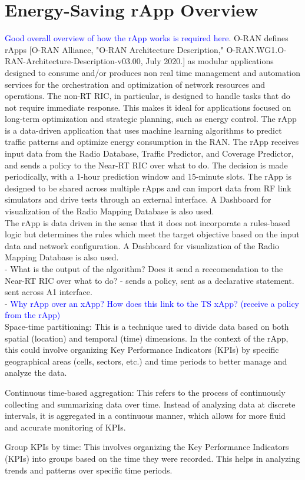 \section{Energy-Saving rApp Overview}
\label{sec:overview}

\textcolor{blue}{Good overall overview of how the rApp works is required here}. 
O-RAN defines rApps [O-RAN Alliance, "O-RAN Architecture Description," O-RAN.WG1.O-RAN-Architecture-Description-v03.00, July 2020.] as modular applications designed to consume and/or produces non real time management and automation services for the orchestration and optimization of network resources and operations. The non-RT RIC, in particular, is designed to handle tasks that do not require immediate response. This makes it ideal for applications focused on long-term optimization and strategic planning, such as energy control. The rApp is a data-driven application that uses machine learning algorithms to predict traffic patterns and optimize energy consumption in the RAN. The rApp receives input data from the Radio Database, Traffic Predictor, and Coverage Predictor, and sends a policy to the Near-RT RIC over what to do. The decision is made periodically, with a 1-hour prediction window and 15-minute slots. The rApp is designed to be shared across multiple rApps and can import data from RF link simulators and drive tests through an external interface. A Dashboard for visualization of the Radio Mapping Database is also used. \\

The rApp is data driven in the sense that it does not incorporate a rules-based logic but determines the rules which meet the target objective based on the input data and network configuration. A Dashboard for visualization of the Radio Mapping Database is also used. \\
- What is the output of the algorithm? Does it send a reccomendation to the Near-RT RIC over what to do? - sends a policy, sent as a declarative statement. sent across A1 interface. \\

- \textcolor{blue}{Why rApp over an xApp? How does this link to the TS xApp? (receive a policy from the rApp)}  \\

Space-time partitioning: This is a technique used to divide data based on both spatial (location) and temporal (time) dimensions. In the context of the rApp, this could involve organizing Key Performance Indicators (KPIs) by specific geographical areas (cells, sectors, etc.) and time periods to better manage and analyze the data.

Continuous time-based aggregation: This refers to the process of continuously collecting and summarizing data over time. Instead of analyzing data at discrete intervals, it is aggregated in a continuous manner, which allows for more fluid and accurate monitoring of KPIs.

Group KPIs by time: This involves organizing the Key Performance Indicators (KPIs) into groups based on the time they were recorded. This helps in analyzing trends and patterns over specific time periods.
